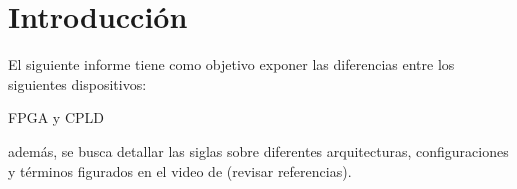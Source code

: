 \section{Introducción}
El siguiente informe tiene como objetivo exponer las diferencias entre los siguientes dispositivos: 
\begin{center}
    FPGA y CPLD
\end{center}
además, se busca detallar las siglas sobre diferentes arquitecturas, configuraciones y términos figurados en el video de \cite{fpga_video} (revisar referencias).
